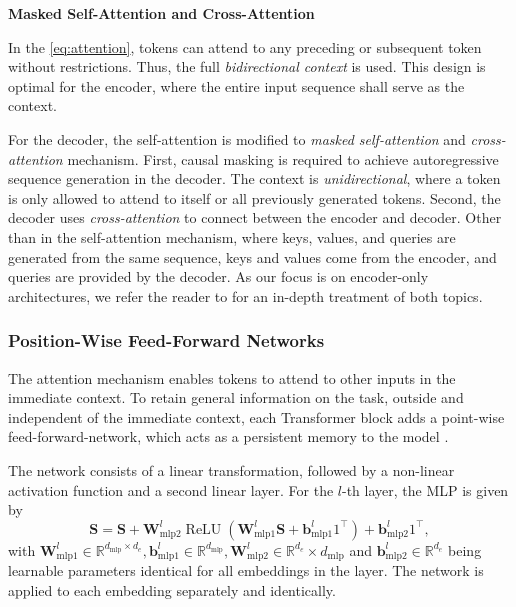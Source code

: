 \textbf{Masked Self-Attention and Cross-Attention}

In the \cref{eq:attention}, tokens can attend to any preceding or subsequent token without restrictions. Thus, the full \emph{bidirectional context} is used. This design is optimal for the encoder, where the entire input sequence shall serve as the context.

For the decoder, the self-attention is modified to \emph{masked self-attention} and \emph{cross-attention} mechanism. First, causal masking is required to achieve autoregressive sequence generation in the decoder. The context is \emph{unidirectional}, where a token is only allowed to attend to itself or all previously generated tokens. Second, the decoder uses \emph{cross-attention} to connect between the encoder and decoder. Other than in the self-attention mechanism, where keys, values, and queries are generated from the same sequence, keys and values come from the encoder, and queries are provided by the decoder. As our focus is on encoder-only architectures, we refer the reader to \textcite[][16--17]{raffelExploringLimitsTransfer2020} for an in-depth treatment of both topics.

\subsubsection{Position-Wise Feed-Forward Networks}\label{sec:position-wise-ffn}

The attention mechanism enables \glspl{token} to attend to other inputs in the immediate context. To retain general information on the task, outside and independent of the immediate context, each Transformer block adds a point-wise \gls{feed-forward-network}, which acts as a persistent memory to the model \autocite[][3]{sukhbaatarAugmentingSelfattentionPersistent2019}.

The network consists of a linear transformation, followed by a non-linear activation function and a second linear layer. For the $l$-th layer, the \gls{MLP} is given by
\begin{equation}
    \mathbf{S} = \mathbf{S}+\mathbf{W}_{\mathrm{mlp} 2}^l \operatorname{ReLU}\left(\mathbf{W}_{\mathrm{mlp} 1}^l \mathbf{S}+\mathbf{b}_{\mathrm{mlp} 1}^l 1^{\top}\right)+\mathbf{b}_{\mathrm{mlp} 2}^l 1^{\top},
\end{equation}
with $\mathbf{W}_{\mathrm{mlp} 1}^l \in \mathbb{R}^{d_{\mathrm{mlp}} \times d_{e}}, \mathbf{b}_{\mathrm{mlp} 1}^l \in \mathbb{R}^{d_{\mathrm{mlp}}}, \mathbf{W}_{\mathrm{mlp} 2}^l \in \mathbb{R}^{d_{e}} \times d_{\mathrm{mlp}}$ and $\mathbf{b}_{\mathrm{mlp} 2}^l \in \mathbb{R}^{d_{e}}$ being learnable parameters identical for all \glspl{embedding} in the layer. The network is applied to each embedding separately and identically.

